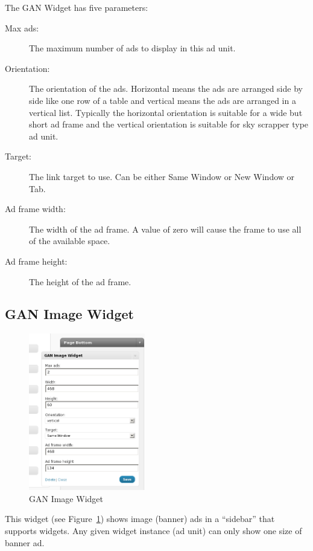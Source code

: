 \documentclass[letterpaper]{article}
\begin{document}
The GAN Widget has five parameters:
\begin{description}
  \item[Max ads:] The maximum number of ads to display in this ad unit.
  \item[Orientation:] The orientation of the ads. Horizontal
means the ads are arranged side by side like one row of a table and
vertical means the ads are arranged in a vertical list. Typically the
horizontal orientation is suitable for a wide but short ad frame and the
vertical orientation is suitable for sky scrapper type ad unit.
  \item[Target:] The link target to use. Can be either Same 
Window or New Window or Tab.
  \item[Ad frame width:] The width of the ad frame. A value
of zero will cause the frame to use all of the available space.
  \item[Ad frame height:] The height of the ad frame.
\end{description}

\subsection{GAN Image Widget}

\begin{figure}[ht]
\begin{centering}
\includegraphics[width=2in]{ganimagewidget.png}
\caption{GAN Image Widget}
\label{fig:ganimagewidget}
\end{centering}
\end{figure}
This widget (see Figure~\ref{fig:ganimagewidget}) shows image (banner) 
ads in a ``sidebar'' that supports widgets.  Any given widget instance
(ad unit) can only show one size of banner ad.
\end{document}
